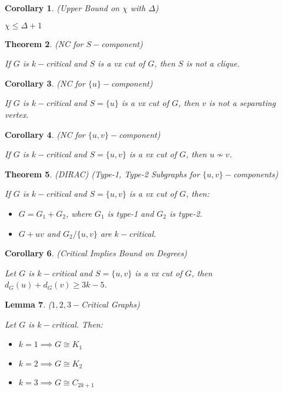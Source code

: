 \documentclass[12pt]{amsart}
\newtheorem{thm}{Theorem}
\newtheorem{lem}[thm]{Lemma}
\newtheorem{cor}[thm]{Corollary}
\theoremstyle{definition}
\begin{document}
\begin{cor} (Upper Bound on $\chi$ with $\Delta$)

$\chi \leq \Delta+1$
\end{cor}


\begin{thm} (NC for $S-$component)

If $G$ is $k-$critical and $S$ is a vx cut of $G$, then $S$ is not a clique.
\end{thm}


\begin{cor} (NC for $\{u\}-$component)

If $G$ is $k-$critical and $S=\{u\}$ is a vx cut of $G$, then $v$ is not a separating vertex.
\end{cor}


\begin{cor} (NC for $\{u,v\}-$component)

If $G$ is $k-$critical and $S=\{u,v\}$ is a vx cut of $G$, then $u\nsim v$.
\end{cor}


\begin{thm} (DIRAC) (Type-1, Type-2 Subgraphs for $\{u,v\}-$components)

If $G$ is $k-$critical and $S=\{u,v\}$ is a vx cut of $G$, then:
\begin{itemize}
  \item $G=G_1+G_2$, where $G_1$ is type-1 and $G_2$ is type-2.
  \item $G+uv$ and $G_2/\{u,v\}$ are $k-$critical.
\end{itemize}
\end{thm}


\begin{cor} (Critical Implies Bound on Degrees)

Let $G$ is $k-$critical and $S=\{u,v\}$ is a vx cut of $G$, then $d_G(u)+d_G(v)\geq 3k-5$.
\end{cor}


\begin{lem} ($1,2,3-$Critical Graphs)

Let $G$ is $k-$critical. Then:
\begin{itemize}
  \item $k=1\implies G \cong K_1$
  \item $k=2\implies G \cong K_2$
  \item $k=3\implies G \cong C_{2k+1}$
\end{itemize}
\end{lem}
\end{document}

